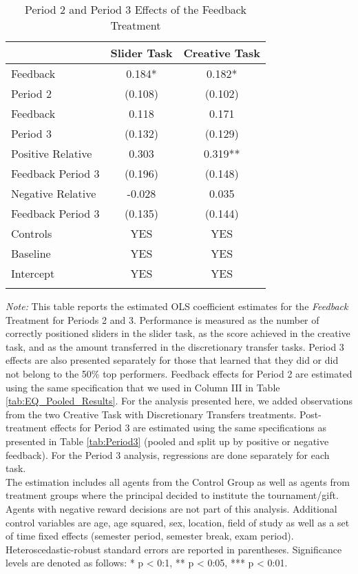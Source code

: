 \begin{table}[h]%
\setlength\tabcolsep{2pt}
\caption{Period 2 and Period 3 Effects of the Feedback Treatment}
\begin{center}%
{\small\renewcommand{\arraystretch}{1}%
\begin{tabular}{lcc}
\hline\hline\noalign{\smallskip}
 & \bf Slider Task & \bf Creative Task \\
\hline\noalign{\smallskip}
\noalign{\smallskip}
Feedback & 0.184* & 0.182* \\
Period 2 & (0.108) & (0.102) \\
\noalign{\smallskip}\hline
\noalign{\smallskip}
Feedback & 0.118 & 0.171 \\
Period 3 & (0.132) & (0.129) \\
\noalign{\smallskip}\hline
\noalign{\smallskip}
Positive Relative & 0.303 & 0.319** \\
Feedback Period 3 & (0.196) & (0.148) \\
\noalign{\smallskip}
Negative Relative & -0.028 & 0.035 \\
Feedback Period 3 & (0.135) & (0.144) \\
\noalign{\smallskip}\hline
\noalign{\smallskip}
 Controls  & YES & YES \\
 Baseline  & YES & YES \\
 Intercept & YES & YES \\
\hline\hline\noalign{\medskip}
\end{tabular}
\begin{minipage}{\textwidth}
\footnotesize {\it Note:}  This table reports the estimated OLS coefficient estimates for the \textit{Feedback} Treatment for Periods 2 and 3. 
Performance is measured as the number of correctly positioned sliders in the slider task, as the score achieved in the  creative task, and as the amount transferred in the discretionary transfer tasks. 
Period 3 effects are also presented separately for those that learned that they did or did not belong to the 50\% top performers. 
Feedback effects for Period 2 are estimated using the same specification that we used in Column III in Table \ref{tab:EQ_Pooled_Results}. 
For the analysis presented here, we added observations from the two Creative Task with Discretionary Transfers treatments. 
Post-treatment effects for Period 3 are estimated using the same specifications as presented in Table \ref{tab:Period3} (pooled and split up by positive or negative feedback). 
For the Period 3 analysis, regressions are done separately for each task. \\
The estimation includes all agents from the Control Group as well as agents from treatment groups where the principal decided to institute the tournament/gift. Agents with negative reward decisions are not part of this analysis. 
Additional control variables are age, age squared, sex, location, field of study as well as a set of time fixed effects (semester period, semester break, exam period). 
Heteroscedastic-robust standard errors are reported in parentheses. Significance levels are denoted as follows: * p < 0:1, ** p < 0:05, *** p < 0:01. 
\end{minipage}}
\end{center}
\label{tab:Feedback}
\end{table}